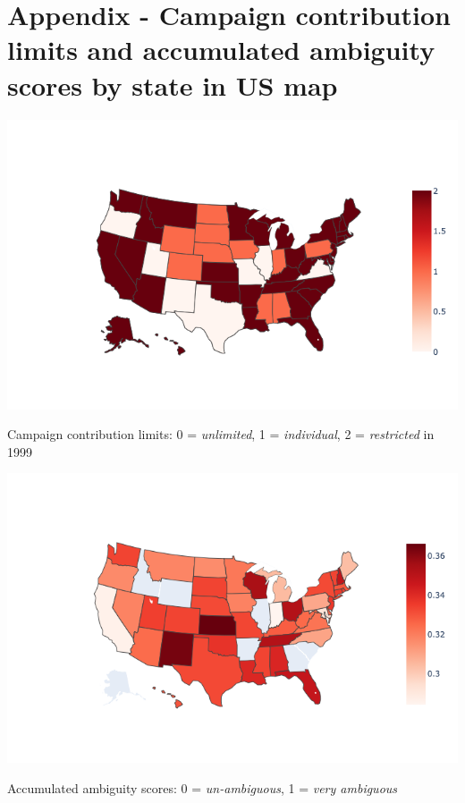 \documentclass{custom_report}
\begin{document}
\section*{Appendix - Campaign contribution limits and accumulated ambiguity scores by state in US map}
\centerline{\includegraphics[width=14cm]{images/usc_map.png}}
\centerline{Campaign contribution limits: 0 = \textit{unlimited}, 1 = \textit{individual}, 2 = \textit{restricted} in 1999}
\centerline{\includegraphics[width=14cm]{images/uss_ambiguity_map.png}}
\centerline{Accumulated ambiguity scores: 0 = \textit{un-ambiguous}, 1 = \textit{very ambiguous} }
\end{document}
